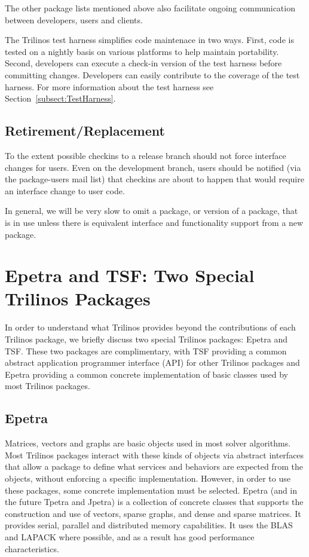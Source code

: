 \documentclass[12pt,relax]{TrilinosDevGuide}
\begin{document}
The other package lists mentioned above also facilitate ongoing
communication between developers, users and clients.

The Trilinos test harness simplifies code maintenace in two ways.  First, code 
is tested on a nightly basis on various platforms to help maintain portability.
Second, developers can execute a check-in version of the test harness before 
committing changes.  Developers can easily contribute to the coverage of the 
test harness.  For more information about the test harness see 
Section~\ref{subsect:TestHarness}.

\subsection{Retirement/Replacement}
To the extent possible checkins to a release branch should not force interface 
changes for users.  Even on the development branch, users should be notified 
(via the package-users mail list) that checkins are about to happen that would 
require an interface change to user code.

In general, we will be very slow to omit a package, or version of a package, 
that is in use unless there is equivalent interface and functionality support 
from a new package.

\section{Epetra and TSF: Two Special Trilinos Packages}
\label{Section:EpetraAndTSF}
In order to understand what Trilinos provides beyond the
contributions of each Trilinos package, we briefly discuss two special
Trilinos packages: Epetra and TSF.  These two packages are complimentary,
with TSF providing a common abstract application
programmer interface (API) for other Trilinos packages and Epetra
providing a common concrete implementation of basic classes used by most
Trilinos packages.

\subsection{Epetra}
Matrices, vectors and graphs are basic objects used in most solver
algorithms. Most Trilinos
packages interact with these kinds of objects via abstract interfaces that
allow a package to define what services and behaviors are expected from the objects,
without enforcing a specific implementation.  However, in order to use
these packages, some concrete
implementation must be selected.  Epetra (and in the future Tpetra and Jpetra) is a collection of concrete
classes that supports the construction and use of vectors, sparse
graphs, and dense and sparse matrices.  It provides serial, parallel and
 distributed memory
capabilities.  It uses the BLAS and LAPACK where possible, and as a
result has good performance characteristics.
\end{document}
